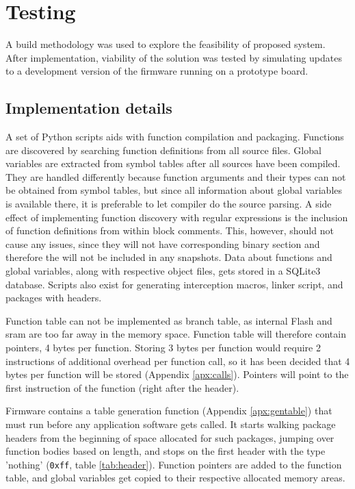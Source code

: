 \newpage
\section{Testing}
\label{s:testing}

A build methodology was used to explore the feasibility of proposed system. After implementation, viability of the solution was tested by simulating updates to a development version of the firmware running on a prototype board.

\subsection{Implementation details}

A set of Python scripts aids with function compilation and packaging. Functions are discovered by searching function definitions from all source files. Global variables are extracted from symbol tables after all sources have been compiled. They are handled differently because function arguments and their types can not be obtained from symbol tables, but since all information about global variables is available there, it is preferable to let compiler do the source parsing. A side effect of implementing function discovery with regular expressions is the inclusion of function definitions from within block comments. This, however, should not cause any issues, since they will not have corresponding binary section and therefore the will not be included in any snapshots. Data about functions and global variables, along with respective object files, gets stored in a SQLite3 database. Scripts also exist for generating interception macros, linker script, and packages with headers.

Function table can not be implemented as branch table, as internal Flash and \gls{sram} are too far away in the memory space. Function table will therefore contain pointers, 4 bytes per function. Storing 3 bytes per function would require 2 instructions of additional overhead per function call, so it has been decided that 4 bytes per function will be stored (Appendix \ref{apx:calls}). Pointers will point to the first instruction of the function (right after the header).

Firmware contains a table generation function (Appendix \ref{apx:gentable}) that must run before any application software gets called. It starts walking package headers from the beginning of space allocated for such packages, jumping over function bodies based on length, and stops on the first header with the type 'nothing' (\texttt{0xff}, table \ref{tab:header}). Function pointers are added to the function table, and global variables get copied to their respective allocated memory areas.

